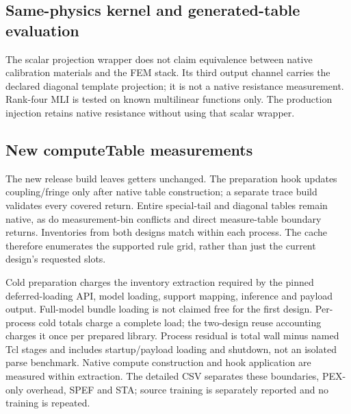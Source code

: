 \documentclass[conference,9pt,letterpaper]{IEEEtran}
\begin{document}
\subsection{Same-physics kernel and generated-table evaluation}

\begin{table}[t]
\begin{minipage}[t]{.48\textwidth}
\centering\caption{Production-related kernel evaluation on the same 71 independently referenced templates.}\label{tab:production}\small
\end{minipage}\hfill
\begin{minipage}[t]{.48\textwidth}
\centering\caption{Full-support numerical and conditional controls; reused warm runtime.}\label{tab:components}\small
\end{minipage}
\par\bigskip
\centering\caption{New Full compute-table deployment: net-C fidelity, mean extraction ratio and cold preparation/PEX/SPEF wall seconds.}\label{tab:deployment}\small
\end{table}

The scalar projection wrapper does not claim equivalence between native calibration materials and the FEM stack. Its third output channel carries the declared diagonal template projection; it is not a native resistance measurement. Rank-four MLI is tested on known multilinear functions only. The production injection retains native resistance without using that scalar wrapper.
\newpage
\subsection{New computeTable measurements}


The new release build leaves getters unchanged. The preparation hook updates coupling/fringe only after native table construction; a separate trace build validates every covered return. Entire special-tail and diagonal tables remain native, as do measurement-bin conflicts and direct measure-table boundary returns. Inventories from both designs match within each process. The cache therefore enumerates the supported rule grid, rather than just the current design's requested slots.

Cold preparation charges the inventory extraction required by the pinned deferred-loading API, model loading, support mapping, inference and payload output. Full-model bundle loading is not claimed free for the first design. Per-process cold totals charge a complete load; the two-design reuse accounting charges it once per prepared library. Process residual is total wall minus named Tcl stages and includes startup/payload loading and shutdown, not an isolated parse benchmark. Native compute construction and hook application are measured within extraction. The detailed CSV separates these boundaries, PEX-only overhead, SPEF and STA; source training is separately reported and no training is repeated.
\end{document}
